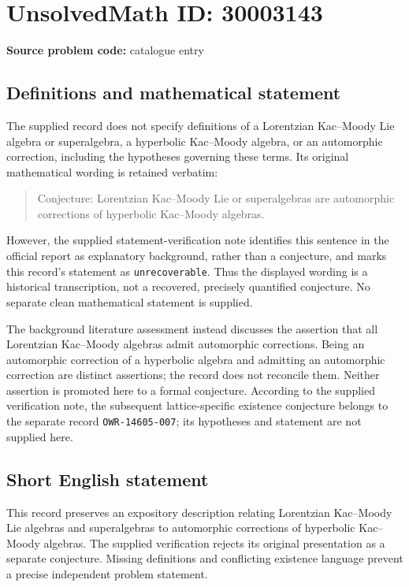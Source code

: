\documentclass[11pt]{article}
\begin{document}
\section*{UnsolvedMath ID: 30003143}
\textbf{Source problem code:} catalogue entry
\subsection{Definitions and mathematical statement}
The supplied record does not specify definitions of a Lorentzian Kac--Moody Lie algebra or superalgebra, a hyperbolic Kac--Moody algebra, or an automorphic correction, including the hypotheses governing these terms. Its original mathematical wording is retained verbatim:
\begin{quote}
Conjecture: Lorentzian Kac--Moody Lie or superalgebras are automorphic corrections of hyperbolic Kac--Moody algebras.
\end{quote}
However, the supplied statement-verification note identifies this sentence in the official report as explanatory background, rather than a conjecture, and marks this record's statement as \texttt{unrecoverable}. Thus the displayed wording is a historical transcription, not a recovered, precisely quantified conjecture. No separate clean mathematical statement is supplied.

The background literature assessment instead discusses the assertion that all Lorentzian Kac--Moody algebras admit automorphic corrections. Being an automorphic correction of a hyperbolic algebra and admitting an automorphic correction are distinct assertions; the record does not reconcile them. Neither assertion is promoted here to a formal conjecture. According to the supplied verification note, the subsequent lattice-specific existence conjecture belongs to the separate record \texttt{OWR-14605-007}; its hypotheses and statement are not supplied here.
\subsection{Short English statement}
This record preserves an expository description relating Lorentzian Kac--Moody Lie algebras and superalgebras to automorphic corrections of hyperbolic Kac--Moody algebras. The supplied verification rejects its original presentation as a separate conjecture. Missing definitions and conflicting existence language prevent a precise independent problem statement.
\end{document}
